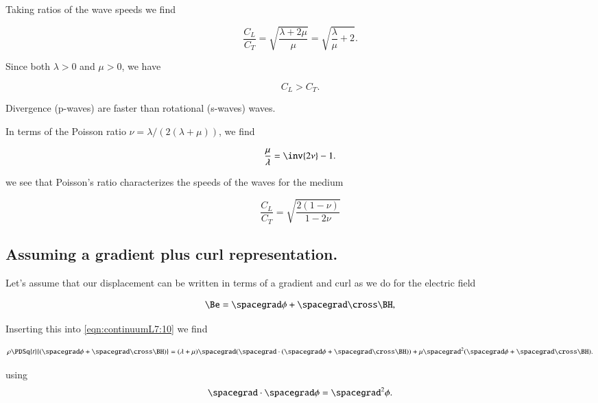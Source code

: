 Taking ratios of the wave speeds we find

\begin{equation}\label{eqn:continuumL7:290}
\frac{C_L}{C_T} = \sqrt{\frac{ \lambda + 2 \mu}{\mu}} = \sqrt{ \frac{\lambda}{\mu} + 2}.
\end{equation}

Since both $\lambda > 0$ and $\mu > 0$, we have

\begin{equation}\label{eqn:continuumL7:310}
C_L > C_T.
\end{equation}

Divergence (p-waves) are faster than rotational (s-waves) waves.

In terms of the Poisson ratio $\nu = \lambda/(2(\lambda + \mu))$, we find

\begin{equation}\label{eqn:continuumL7:330}
\frac{\mu}{\lambda} = \inv{2 \nu} - 1.
\end{equation}

we see that Poisson's ratio characterizes the speeds of the waves for the medium

\begin{equation}\label{eqn:continuumL7:350}
\frac{C_L}{C_T} = \sqrt{\frac{2(1-\nu)}{1 - 2\nu}}
\end{equation}

\subsection{Assuming a gradient plus curl representation.}

Let's assume that our displacement can be written in terms of a gradient and curl as we do for the electric field

\begin{equation}\label{eqn:continuumL7:370}
\Be = \spacegrad \phi + \spacegrad \cross \BH,
\end{equation}

Inserting this into \ref{eqn:continuumL7:10} we find

\begin{equation}\label{eqn:continuumL7:390}
\rho \PDSq{t}{(\spacegrad \phi + \spacegrad \cross \BH)} = (\lambda + \mu) \spacegrad (\spacegrad \cdot (\spacegrad \phi + \spacegrad \cross \BH)) + \mu \spacegrad^2 (\spacegrad \phi + \spacegrad \cross \BH).
\end{equation}

using 
\begin{equation}\label{eqn:continuumL7:410}
\spacegrad \cdot \spacegrad \phi = \spacegrad^2 \phi.
\end{equation}

